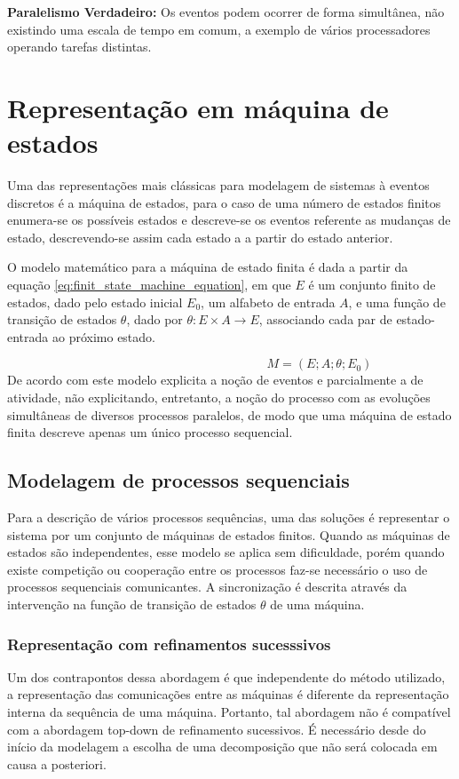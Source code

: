 \textbf{Paralelismo Verdadeiro:} Os eventos podem ocorrer de forma simultânea, não existindo uma escala de tempo em comum, a exemplo de vários processadores operando tarefas distintas.

\section{Representação em máquina de estados}
Uma das representações mais clássicas para modelagem de sistemas à eventos discretos é a máquina de estados, para o caso de uma número de estados finitos enumera-se os possíveis estados e descreve-se os eventos referente as mudanças de estado, descrevendo-se assim cada estado a a partir do estado anterior.

O modelo matemático para a máquina de estado finita é dada a partir da equação \ref*{eq:finit_state_machine_equation}, em que $E$ é um conjunto finito de estados, dado pelo estado inicial $E_0$, um alfabeto de entrada $A$, e uma função de transição de estados $\theta$, dado por $\theta : E \times A \rightarrow E$, associando cada par de estado-entrada ao próximo estado.

\begin{equation}\label{eq:finit_state_machine_equation}
\hspace{6cm} %
    M = (E; A; \theta; E_0)
\end{equation}
De acordo com \cite{vallete} este modelo explicita a noção de eventos e parcialmente a de atividade, não explicitando, entretanto, a noção do processo com as evoluções simultâneas de diversos processos paralelos, de modo que uma máquina de estado finita descreve apenas um único processo sequencial.

\subsection{Modelagem de processos sequenciais}
Para a descrição de vários processos sequências, uma das soluções é representar o sistema por um conjunto de máquinas de estados finitos. Quando as máquinas de estados são independentes, esse modelo se aplica sem dificuldade, porém quando existe competição ou cooperação entre os processos faz-se necessário o uso de processos sequenciais comunicantes. A sincronização é descrita através da intervenção na função de transição de estados $\theta$ de uma máquina.

\subsubsection{Representação com refinamentos sucesssivos}
Um dos contrapontos dessa abordagem é que independente do método utilizado, a representação das comunicações entre as máquinas é diferente da representação interna da sequência de uma máquina. Portanto, tal abordagem não é compatível com a abordagem top-down de refinamento sucessivos. É necessário desde do início da modelagem a escolha de uma decomposição que não será colocada em causa a posteriori. 

